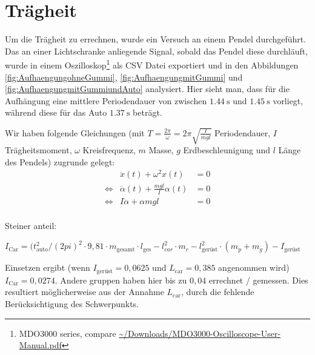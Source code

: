 \documentclass[10pt]{article}
\begin{document}
\section{Trägheit}
Um die Trägheit zu errechnen, wurde ein Versuch an einem Pendel durchgeführt.
Das an einer Lichtschranke anliegende Signal, sobald das Pendel diese durchläuft, wurde in einem Oszilloskop\footnote{MDO3000 series, compare \url{~/Downloads/MDO3000-Oscilloscope-User-Manual.pdf}} als CSV Datei exportiert und in den Abbildungen \ref{fig:AufhaengungohneGummi}, \ref{fig:AufhaengungmitGummi} und \ref{fig:AufhaengungmitGummiundAuto} analysiert.
Hier sieht man, dass für die Aufhängung eine mittlere Periodendauer von zwischen $\SI{1,44}{\second}$ und $\SI{1,45}{\second}$ vorliegt, während diese für das Auto $\SI{1,37}{\second}$ beträgt.

Wir haben folgende Gleichungen (mit $T=\frac{2\pi}{\omega} = 2\pi\sqrt{\frac{I}{mgl}}$ Periodendauer, $I$ Trägheitsmoment, $\omega$ Kreisfrequenz, $m$ Masse, $g$ Erdbeschleunigung und $l$ Länge des Pendels) zugrunde gelegt:
\begin{eqnarray}
    &\ddot{x}(t) + \omega^2x(t)& = 0 \\
    \Leftrightarrow &\ddot{\alpha}(t) + \frac{mgl}{I}\alpha(t)& = 0 \\
    \Leftrightarrow &I\ddot{\alpha} + \alpha mgl& = 0 \\
\end{eqnarray}


Steiner anteil:

$I_{\text{Car}}=(t_{\text{auto}}^2/(2pi)^2\cdot 9,81\cdot m_{\text{gesamt}}\cdot l_{\text{ges}}-l_{car}^2\cdot m_c-l_{\text{gerüst}}^2\cdot (m_p+m_g)-I_{\text{gerüst}}$

Einsetzen ergibt (wenn $I_{\text{gerüst}} = 0,0625$ und $L_{\text{car}} = 0,385$ angenommen wird) $I_{\text{Car}} = 0,0274$. Andere gruppen haben hier bis zu $0,04$ errechnet / gemessen. Dies resultiert möglicherweise aus der Annahme $L_{\text{car}}$, durch die fehlende Berücksichtigung des Schwerpunkts.
\end{document}
